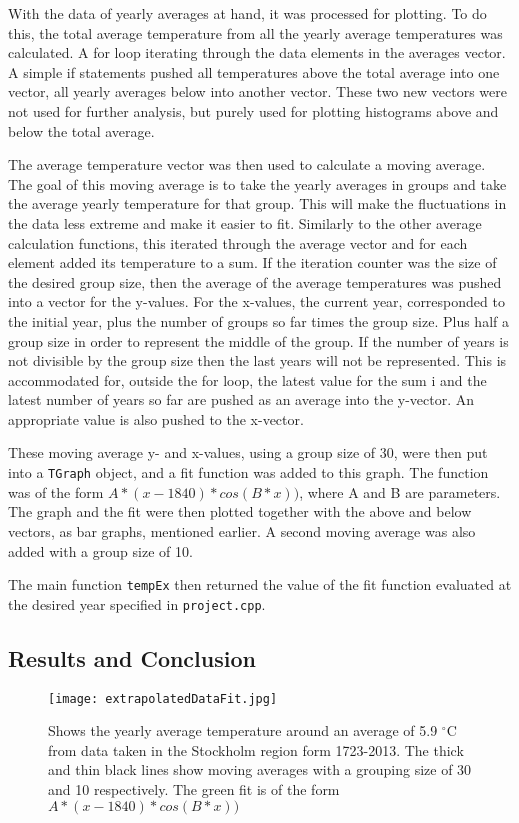 With the data of yearly averages at hand, it was processed for plotting. To do this, the total average temperature from all the yearly average temperatures was calculated. A for loop iterating through the data elements in the averages vector. A simple if statements pushed all temperatures above the total average into one vector, all yearly averages below into another vector. These two new vectors were not used for further analysis, but purely used for plotting histograms above and below the total average.

The average temperature vector was then used to calculate a moving average. The goal of this moving average is to take the yearly averages in groups and take the average yearly temperature for that group. This will make the fluctuations in the data less extreme and make it easier to fit. Similarly to the other average calculation functions, this iterated through the average vector and for each element added its temperature to a sum. If the iteration counter was the size of the desired group size, then the average of the average temperatures was pushed into a vector for the y-values. For the x-values, the current year, corresponded to the initial year, plus the number of groups so far times the group size. Plus half a group size in order to represent the middle of the group. If the number of years is not divisible by the group size then the last years will not be represented. This is accommodated for, outside the for loop, the latest value for the sum i and the latest number of years so far are pushed as an average into the y-vector. An appropriate value is also pushed to the x-vector.

These moving average y- and x-values, using a group size of 30, were then put into a \texttt{TGraph} object, and a fit function was added to this graph. The function was of the form $A*(x-1840)*cos(B*x))$, where A and B are parameters. The graph and the fit were then plotted together with the above and below vectors, as bar graphs, mentioned earlier. A second moving average was also added with a group size of 10.

The main function \texttt{tempEx} then returned the value of the fit function evaluated at the desired year specified in \texttt{project.cpp}.

\subsection{Results and Conclusion}

\begin{figure}[h!]
\begin{center}
\texttt{[image: extrapolatedDataFit.jpg]}
\caption{\label{fig:extrap1}Shows the yearly average temperature around an average of 5.9 $^{\circ}$C from data taken in the Stockholm region form 1723-2013. The thick and thin black lines show moving averages with a grouping size of 30 and 10 respectively. The green fit is of the form $A*(x-1840)*cos(B*x))$}
\end{center}
\end{figure}

